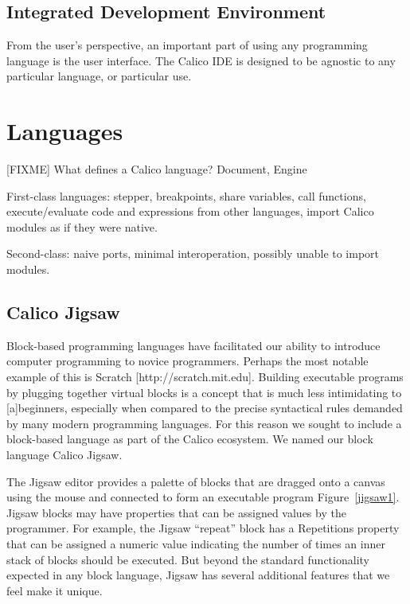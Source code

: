 \documentclass[preprint]{sigplanconf}
\begin{document}
\subsection{Integrated Development Environment}

From the user's perspective, an important part of using any
programming language is the user interface. The Calico IDE is designed
to be agnostic to any particular language, or particular use.

\section{Languages}

[FIXME] What defines a Calico language? Document, Engine

First-class languages: stepper, breakpoints, share variables, call
functions, execute/evaluate code and expressions from other languages,
import Calico modules as if they were native.

Second-class: naive ports, minimal interoperation, possibly unable to
import modules.

\subsection{Calico Jigsaw}

Block-based programming languages have facilitated our ability to
introduce computer programming to novice programmers. Perhaps the most
notable example of this is Scratch [http://scratch.mit.edu]. Building
executable programs by plugging together virtual blocks is a concept
that is much less intimidating to [a]beginners, especially when
compared to the precise syntactical rules demanded by many modern
programming languages. For this reason we sought to include a
block-based language as part of the Calico ecosystem. We named our
block language Calico Jigsaw.

The Jigsaw editor provides a palette of blocks that are dragged onto a
canvas using the mouse and connected to form an executable program
Figure~\ref{jigsaw1}. Jigsaw blocks may have properties that can be assigned
values by the programmer. For example, the Jigsaw ``repeat'' block has
a Repetitions property that can be assigned a numeric value indicating
the number of times an inner stack of blocks should be executed. But
beyond the standard functionality expected in any block language,
Jigsaw has several additional features that we feel make it unique.
\end{document}
